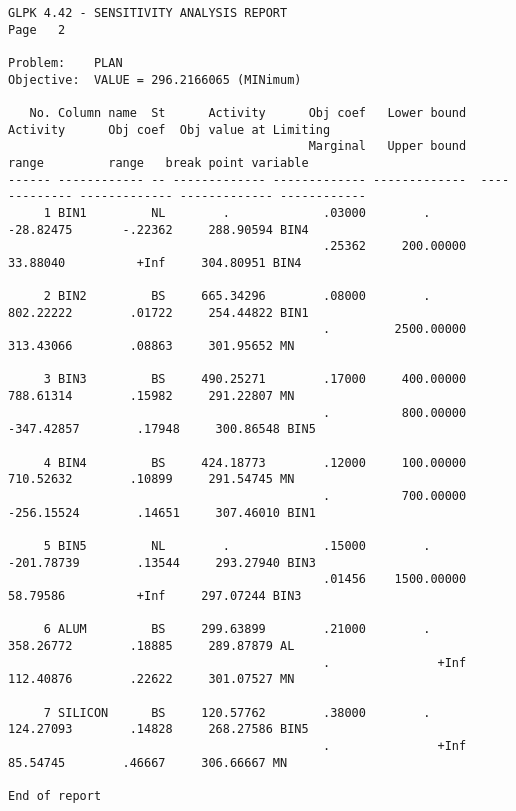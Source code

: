\begin{landscape}
\begin{scriptsize}
\begin{verbatim}
GLPK 4.42 - SENSITIVITY ANALYSIS REPORT                                                                         Page   2

Problem:    PLAN
Objective:  VALUE = 296.2166065 (MINimum)

   No. Column name  St      Activity      Obj coef   Lower bound       Activity      Obj coef  Obj value at Limiting
                                          Marginal   Upper bound          range         range   break point variable
------ ------------ -- ------------- ------------- -------------  ------------- ------------- ------------- ------------
     1 BIN1         NL        .             .03000        .           -28.82475       -.22362     288.90594 BIN4
                                            .25362     200.00000       33.88040          +Inf     304.80951 BIN4

     2 BIN2         BS     665.34296        .08000        .           802.22222        .01722     254.44822 BIN1
                                            .         2500.00000      313.43066        .08863     301.95652 MN

     3 BIN3         BS     490.25271        .17000     400.00000      788.61314        .15982     291.22807 MN
                                            .          800.00000     -347.42857        .17948     300.86548 BIN5

     4 BIN4         BS     424.18773        .12000     100.00000      710.52632        .10899     291.54745 MN
                                            .          700.00000     -256.15524        .14651     307.46010 BIN1

     5 BIN5         NL        .             .15000        .          -201.78739        .13544     293.27940 BIN3
                                            .01456    1500.00000       58.79586          +Inf     297.07244 BIN3

     6 ALUM         BS     299.63899        .21000        .           358.26772        .18885     289.87879 AL
                                            .               +Inf      112.40876        .22622     301.07527 MN

     7 SILICON      BS     120.57762        .38000        .           124.27093        .14828     268.27586 BIN5
                                            .               +Inf       85.54745        .46667     306.66667 MN

End of report
\end{verbatim}
\end{scriptsize}
\end{landscape}

